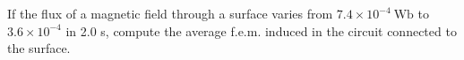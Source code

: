 If the flux of a magnetic field through a surface %
varies from 
$7.4 \times 10^{-4}\ \text{Wb}$ to $3.6 \times 10^{-4}$ in 
2.0 s, compute the average f.e.m. induced in
the circuit connected to the surface.